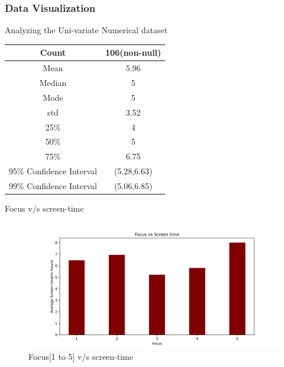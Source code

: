 \documentclass{beamer}
\begin{document}
\begin{frame}
\frametitle{Data Visualization}
\begin{block}{Analyzing the Uni-variate Numerical dataset}
\begin{center}
\begin{tabular}{|c|c|}
\hline 
Count & 106(non-null) \\ 
\hline 
Mean & 5.96 \\ 
\hline 
Median & 5 \\ 
\hline 
Mode & 5 \\ 
\hline 
std & 3.52 \\ 
\hline 
25\% & 4 \\ 
\hline 
50\% & 5 \\ 
\hline 
75\% & 6.75 \\ 
\hline 
95\% Confidence Interval & (5.28,6.63) \\ 
\hline
99\% Confidence Interval & (5.06,6.85) \\ 
\hline
\end{tabular} 
\end{center}
\end{block}
\end{frame}

\begin{frame}
\begin{block}{Focus v/s screen-time}
\begin{figure}[hbtp]
\caption{Focus[1 to 5] v/s screen-time}
\centering
\includegraphics[scale=0.5]{Focus_vs_Screen_time.png}
\end{figure}
\end{block}
\end{frame}
\end{document}

